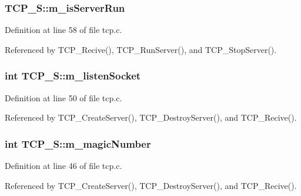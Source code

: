 \subsubsection[{\texorpdfstring{m\+\_\+is\+Server\+Run}{m_isServerRun}}]{ T\+C\+P\+\_\+\+S\+::m\+\_\+is\+Server\+Run}\hypertarget{structTCP__S_a5f5f617932576fbab6f37206c233145c}{}\label{structTCP__S_a5f5f617932576fbab6f37206c233145c}


Definition at line 58 of file tcp.\+c.



Referenced by T\+C\+P\+\_\+\+Recive(), T\+C\+P\+\_\+\+Run\+Server(), and T\+C\+P\+\_\+\+Stop\+Server().

\subsubsection[{\texorpdfstring{m\+\_\+listen\+Socket}{m_listenSocket}}]{\setlength{\rightskip}{0pt plus 5cm}int T\+C\+P\+\_\+\+S\+::m\+\_\+listen\+Socket}\hypertarget{structTCP__S_a4f0bcd2854168cda93a59f669862ca55}{}\label{structTCP__S_a4f0bcd2854168cda93a59f669862ca55}


Definition at line 50 of file tcp.\+c.



Referenced by T\+C\+P\+\_\+\+Create\+Server(), T\+C\+P\+\_\+\+Destroy\+Server(), and T\+C\+P\+\_\+\+Recive().

\subsubsection[{\texorpdfstring{m\+\_\+magic\+Number}{m_magicNumber}}]{\setlength{\rightskip}{0pt plus 5cm}int T\+C\+P\+\_\+\+S\+::m\+\_\+magic\+Number}\hypertarget{structTCP__S_affe8822a76f550fd7011539d9c2ce155}{}\label{structTCP__S_affe8822a76f550fd7011539d9c2ce155}


Definition at line 46 of file tcp.\+c.



Referenced by T\+C\+P\+\_\+\+Create\+Server(), T\+C\+P\+\_\+\+Destroy\+Server(), and T\+C\+P\+\_\+\+Recive().

